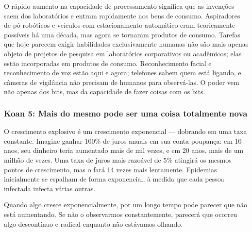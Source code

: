 O rápido aumento na capacidade de processamento significa que as invenções saem 
dos laboratórios e entram rapidamente nos bens de consumo. Aspiradores de pó 
robóticos e veículos com estacionamento automático eram teoricamente possíveis 
há uma década, mas agora se tornaram produtos de consumo. Tarefas que hoje 
parecem exigir habilidades exclusivamente humanas não são mais apenas objeto de 
projetos de pesquisa em laboratórios corporativos ou acadêmicos; elas estão 
incorporadas em produtos de consumo. Reconhecimento facial e reconhecimento de 
voz estão aqui e agora; telefones sabem quem está ligando, e câmeras de 
vigilância não precisam de humanos para observá-las. O poder vem não apenas dos 
bits, mas da capacidade de fazer coisas com os bits.

\subsubsection*{Koan 5: Mais do mesmo pode ser uma coisa totalmente nova}
\label{cap1:exp-dig-koans:5}
O crescimento explosivo é um crescimento exponencial --- dobrando em uma taxa 
constante. Imagine ganhar 100\% de juros anuais em sua conta poupança: em 10 
anos, seu dinheiro teria aumentado mais de mil vezes, e em 20 anos, mais de um 
milhão de vezes. Uma taxa de juros mais razoável de 5\% atingirá os mesmos 
pontos de crescimento, mas o fará 14 vezes mais lentamente. Epidemias 
inicialmente se espalham de forma exponencial, à medida que cada pessoa 
infectada infecta várias outras.

Quando algo cresce exponencialmente, por um longo tempo pode parecer que não 
está aumentando. Se não o observarmos constantemente, parecerá que ocorreu algo
descontínuo e radical enquanto não estávamos olhando.

